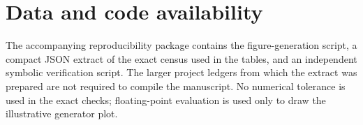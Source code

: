 \documentclass[11pt]{article}
\theoremstyle{definition}
\theoremstyle{remark}
\begin{document}
\section*{Data and code availability}
The accompanying reproducibility package contains the figure-generation script, a compact JSON extract of the exact census used in the tables, and an independent symbolic verification script. The larger project ledgers from which the extract was prepared are not required to compile the manuscript. No numerical tolerance is used in the exact checks; floating-point evaluation is used only to draw the illustrative generator plot.

\printbibliography
\end{document}
